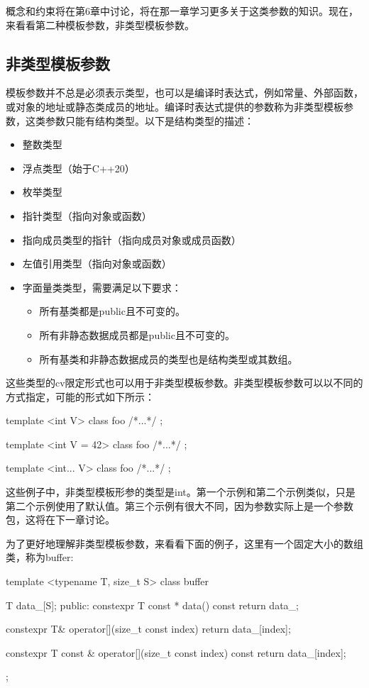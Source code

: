 概念和约束将在第6章中讨论，将在那一章学习更多关于这类参数的知识。现在，来看看第二种模板参数，非类型模板参数。


\subsection{非类型模板参数}

模板参数并不总是必须表示类型，也可以是编译时表达式，例如常量、外部函数，或对象的地址或静态类成员的地址。编译时表达式提供的参数称为非类型模板参数，这类参数只能有结构类型。以下是结构类型的描述：

\begin{itemize}
  \item 整数类型
  \item 浮点类型（始于C++20）
  \item 枚举类型
  \item 指针类型（指向对象或函数）
  \item 指向成员类型的指针（指向成员对象或成员函数）
  \item 左值引用类型（指向对象或函数）
  \item 字面量类类型，需要满足以下要求：
        \begin{itemize}
          \item 所有基类都是public且不可变的。
          \item 所有非静态数据成员都是public且不可变的。
          \item 所有基类和非静态数据成员的类型也是结构类型或其数组。
        \end{itemize}
\end{itemize}

这些类型的cv限定形式也可以用于非类型模板参数。非类型模板参数可以以不同的方式指定，可能的形式如下所示：

\begin{cppcode}
template <int V>
class foo { /*...*/ };

template <int V = 42>
class foo { /*...*/ };

template <int... V>
class foo { /*...*/ };
\end{cppcode}

这些例子中，非类型模板形参的类型是int。第一个示例和第二个示例类似，只是第二个示例使用了默认值。第三个示例有很大不同，因为参数实际上是一个参数包，这将在下一章讨论。

为了更好地理解非类型模板参数，来看看下面的例子，这里有一个固定大小的数组类，称为buffer:

\begin{cppcode}
template <typename T, size_t S>
class buffer
{
	T data_[S];
public:
	constexpr T const * data() const { return data_; }
	
	constexpr T& operator[](size_t const index)
	{
		return data_[index];
	}

	constexpr T const & operator[](size_t const index) const
	{
		return data_[index];
	}
};
\end{cppcode}


